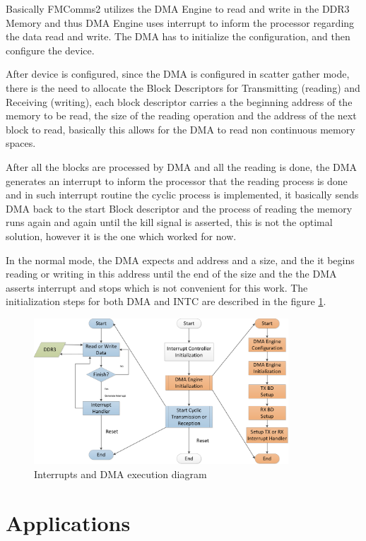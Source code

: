 Basically FMComms2 utilizes the DMA Engine to read and write in the DDR3 Memory
and thus DMA Engine uses interrupt to inform the processor regarding the data
read and write. The DMA has to initialize the configuration, and then configure
the device.

After device is configured, since the DMA is configured in scatter gather mode,
there is the need to allocate the Block Descriptors for Transmitting (reading)
and Receiving (writing), each block descriptor carries a the beginning address
of the memory to be read, the size of the reading operation and the address of
the next block to read, basically this allows for the DMA to read non continuous
memory spaces.

After all the blocks are processed by DMA and all the reading is done, the DMA
generates an interrupt to inform the processor that the reading process is done
and in such interrupt routine the cyclic process is implemented, it basically
sends DMA back to the start Block descriptor and the process of reading the
memory runs again and again until the kill signal is asserted, this is not the
optimal solution, however it is the one which worked for now.

 In the normal mode, the DMA expects and address and a size, and the it begins
reading or writing in this address until the end of the size and the the DMA
asserts interrupt and stops which is not convenient for this work. The
initialization steps for both DMA and INTC are described in the figure
\ref{fig:intcdmainit}.

\begin{figure}[htbp]
    \centering
    \includegraphics[width=0.85\textwidth]{./figures/dma_intc_driver}
    \caption{ Interrupts and DMA execution diagram
    \label{fig:intcdmainit}}
\end{figure}

\section{Applications}

